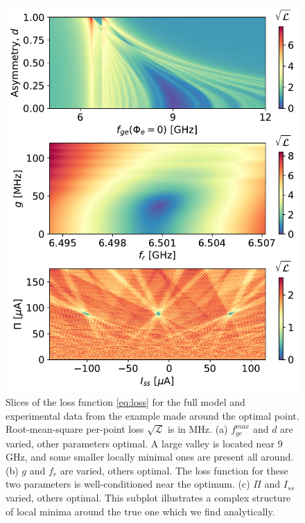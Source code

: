 \documentclass[%
 aip,
 draft,
 amsmath,amssymb,
 reprint,%
]{revtex4-1}
\begin{document}
\begin{figure}
	\centering
	\includegraphics[width=\linewidth]{loss1}
	\caption{Slices of the loss function \eqref{eq:loss} for the full model and experimental data from the example made around the optimal point. Root-mean-square per-point loss $\sqrt{\mathcal{L}}$ is in MHz. (a) $f_{ge}^{max}$ and $d$ are varied, other parameters optimal. A large valley is located near 9 GHz, and some smaller locally minimal ones are present all around. (b) $g$ and $f_r$ are varied, others optimal. The loss function for these two parameters is well-conditioned near the optimum. (c) $\Pi$ and $I_{ss}$ varied, others optimal. This subplot illustrates a complex structure of local minima around the true one which we find analytically.}
	\label{fig:loss}
\end{figure}
\end{document}
